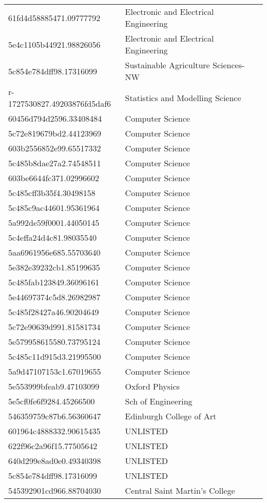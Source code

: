\begin{tabular}{ll}
61fd4d58885471.09777792 & Electronic and Electrical Engineering \\
5e4c1105b44921.98826056 & Electronic and Electrical Engineering \\
5c854e784dff98.17316099 & Sustainable Agriculture Sciences-NW \\
r-1727530827.49203876fd5daf6 & Statistics and Modelling Science \\
60456d794d2596.33408484 & Computer Science \\
5c72e819679bd2.44123969 & Computer Science \\
603b2556852e99.65517332 & Computer Science \\
5c485b8dae27a2.74548511 & Computer Science \\
603be6644fc371.02996602 & Computer Science \\
5c485cff3b35f4.30498158 & Computer Science \\
5c485c9ac44601.95361964 & Computer Science \\
5a992de59f0001.44050145 & Computer Science \\
5c4effa24d4c81.98035540 & Computer Science \\
5aa6961956e685.55703640 & Computer Science \\
5e382e39232cb1.85199635 & Computer Science \\
5c485fab123849.36096161 & Computer Science \\
5e44697374c5d8.26982987 & Computer Science \\
5c485f28427a46.90204649 & Computer Science \\
5c72e90639d991.81581734 & Computer Science \\
5e579958615580.73795124 & Computer Science \\
5c485c11d915d3.21995500 & Computer Science \\
5a9d47107153c1.67019655 & Computer Science \\
5e553999bfeab9.47103099 & Oxford Physics \\
5e5cf0fe6f9284.45266500 & Sch of Engineering \\
546359759c87b6.56360647 & Edinburgh College of Art \\
601964c4888332.90615435 & UNLISTED \\
622f96c2a96f15.77505642 & UNLISTED \\
640d299e8ad0e0.49340398 & UNLISTED \\
5c854e784dff98.17316099 & UNLISTED \\
545392901cd966.88704030 & Central Saint Martin's College \\

\end{tabular}
